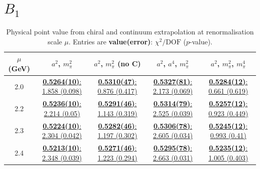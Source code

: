 \documentclass[12pt]{extarticle}
\begin{document}
\section{$B_1$}
\begin{table}[h!]
\begin{center}
\begin{tabular}{|c|c|c|c|c|}
\hline
$\mu$ (GeV) & $a^2$, $m_\pi^2$& $a^2$, $m_\pi^2$ (no C)& $a^2$, $a^4$, $m_\pi^2$& $a^2$, $m_\pi^2$, $m_\pi^4$\\
\hline
2.0& \hyperlink{VVpAA/SUSY/a2m2_20.pdf.1}{\textbf{0.5264(10)}: 1.858 (0.098)} & \hyperlink{VVpAA/SUSY/a2m2noC_20.pdf.1}{\textbf{0.5310(47)}: 0.876 (0.417)} & \hyperlink{VVpAA/SUSY/a2a4m2_20.pdf.1}{\textbf{0.5327(81)}: 2.173 (0.069)} & \hyperlink{VVpAA/SUSY/a2m2m4_20.pdf.1}{\textbf{0.5284(12)}: 0.661 (0.619)}\\
2.2& \hyperlink{VVpAA/SUSY/a2m2_22.pdf.1}{\textbf{0.5236(10)}: 2.214 (0.05)} & \hyperlink{VVpAA/SUSY/a2m2noC_22.pdf.1}{\textbf{0.5291(46)}: 1.143 (0.319)} & \hyperlink{VVpAA/SUSY/a2a4m2_22.pdf.1}{\textbf{0.5314(79)}: 2.525 (0.039)} & \hyperlink{VVpAA/SUSY/a2m2m4_22.pdf.1}{\textbf{0.5257(12)}: 0.923 (0.449)}\\
2.3& \hyperlink{VVpAA/SUSY/a2m2_23.pdf.1}{\textbf{0.5224(10)}: 2.304 (0.042)} & \hyperlink{VVpAA/SUSY/a2m2noC_23.pdf.1}{\textbf{0.5282(46)}: 1.197 (0.302)} & \hyperlink{VVpAA/SUSY/a2a4m2_23.pdf.1}{\textbf{0.5306(78)}: 2.605 (0.034)} & \hyperlink{VVpAA/SUSY/a2m2m4_23.pdf.1}{\textbf{0.5245(12)}: 0.993 (0.41)}\\
2.4& \hyperlink{VVpAA/SUSY/a2m2_24.pdf.1}{\textbf{0.5213(10)}: 2.348 (0.039)} & \hyperlink{VVpAA/SUSY/a2m2noC_24.pdf.1}{\textbf{0.5271(46)}: 1.223 (0.294)} & \hyperlink{VVpAA/SUSY/a2a4m2_24.pdf.1}{\textbf{0.5295(78)}: 2.663 (0.031)} & \hyperlink{VVpAA/SUSY/a2m2m4_24.pdf.1}{\textbf{0.5235(12)}: 1.005 (0.403)}\\
\hline
\end{tabular}
\caption{Physical point value from chiral and continuum extrapolation at renormalisation scale $\mu$. Entries are \textbf{value(error)}: $\chi^2/\text{DOF}$ ($p$-value).}
\end{center}
\end{table}
\end{document}
